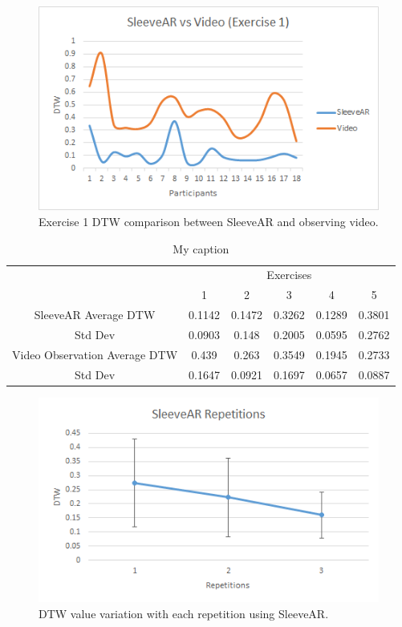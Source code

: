 \begin{figure}[!t]
    \centering
    \includegraphics{imgs/results/sleevearVSvideoEx1.png}
    \caption{Exercise 1 DTW comparison between SleeveAR and observing video.}
    \label{fig:sleevearVSvideoEx1}
\end{figure}



\begin{table}[!t]
\centering
\begin{tabular}{c|c|c|c|c|c|}
\cline{2-6}
\multicolumn{1}{l|}{}                               & \multicolumn{5}{c|}{Exercises}             \\ \cline{2-6} 
                                                    & 1      & 2      & 3      & 4      & 5      \\ \hline
\multicolumn{1}{|c|}{SleeveAR Average DTW}          & 0.1142 & 0.1472 & 0.3262 & 0.1289 & 0.3801 \\ \hline
\multicolumn{1}{|c|}{Std Dev}                       & 0.0903 & 0.148  & 0.2005 & 0.0595 & 0.2762 \\ \hline
\multicolumn{1}{|c|}{Video Observation Average DTW} & 0.439  & 0.263  & 0.3549 & 0.1945 & 0.2733 \\ \hline
\multicolumn{1}{|c|}{Std Dev}                       & 0.1647 & 0.0921 & 0.1697 & 0.0657 & 0.0887 \\ \hline
\end{tabular}
\caption{My caption}
\label{table:dtwavg}
\end{table}

\begin{figure}[!t]
    \centering
    \includegraphics{imgs/results/dtw_repetitions.png}
    \caption{DTW value variation with each repetition using SleeveAR.}
    \label{fig:dtw_repetitions}
\end{figure}

